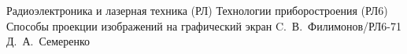 \documentclass{bmstu}
\begin{document}
\makecourseworktitle
	{Радиоэлектроника и лазерная техника (РЛ)}
	{Технологии приборостроения (РЛ6)}
	{Способы проекции изображений на графический экран}
	{C.~В.~Филимонов/РЛ6-71}
	{Д.~А.~Семеренко}
	{}
	{}
	{}

\maketableofcontents

%
%




\end{document}
